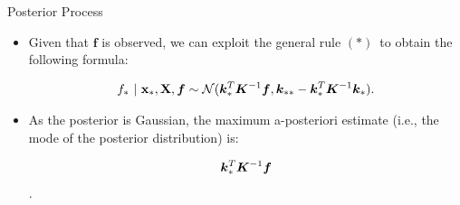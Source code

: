 \begin{frame}[c,allowframebreaks]{Posterior Process}
\framebreak


\begin{itemize}

\item Given that $\bm{f}$ is observed, we can exploit the general rule ${(*)}\,$ to obtain the following formula: 

\begin{eqnarray*}
f_* ~|~ \mathbf{x}_*, \mathbf{X}, \bm{f} \sim \mathcal{N}(\bm{k}_{*}^{T}\bm{K}^{-1}\bm{f}, \bm{k}_{**} - \bm{k}_*^T \bm{K} ^{-1}\bm{k}_*).
\end{eqnarray*}

\lz
\lz

\item[\faLightbulbO] As the posterior is Gaussian, the maximum a-posteriori estimate (i.e., the mode of the posterior distribution) is:

\large $$\bm{k}_{*}^{T}\bm{K}^{-1}\bm{f}$$.

\end{itemize}
\end{frame}

